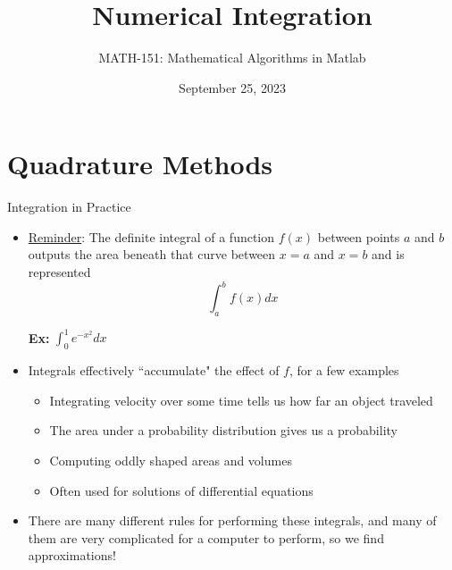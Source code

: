 {}\documentclass[letterpaper,
compress,
xcolor=x11names,
]{beamer}
\begin{document}
	\title{Numerical Integration}
	\author{MATH-151:  Mathematical Algorithms in Matlab}
	\date[202X]{September 25, 2023}




\begin{frame}
\titlepage
\end{frame}
\section{Quadrature Methods}

\begin{frame}{Integration in Practice}
	\footnotesize
	\begin{itemize}
		\item \underline{Reminder}: The definite integral of a function $f(x)$ between points $a$ and $b$ outputs the area beneath that curve between $x=a$ and $x=b$ and is represented 
		\begin{equation*}
			\int_{a}^{b}f(x)dx
		\end{equation*}
		\begin{center}
			\textbf{Ex:} $\displaystyle \int_{0}^{1} e^{-x^2} dx$ \hspace{0.5cm}
		\end{center}
		\item Integrals effectively ``accumulate" the effect of $f$, for a few examples
		\begin{itemize}
			\item Integrating velocity over some time tells us how far an object traveled
			\item The area under a probability distribution gives us a probability
			\item Computing oddly shaped areas and volumes
			\item Often used for solutions of differential equations
		\end{itemize}
		\item There are many different rules for performing these integrals, and many of them are very complicated for a computer to perform, so we find approximations!
	\end{itemize}
\end{frame}
\end{document}
